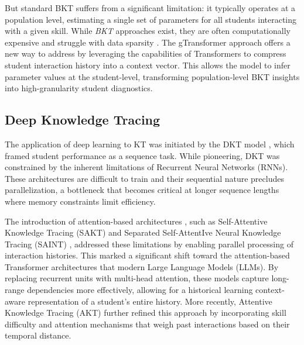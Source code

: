 \documentclass[applsci,article,submit,moreauthors,pdftex]{Definitions/mdpi}
\begin{document}
But standard BKT suffers from a significant limitation: it typically operates at a population level, estimating a single set of parameters for all students interacting with a given skill. While \textit{ BKT} approaches exist, they are often computationally expensive and struggle with data sparsity \citep{yudelson2013individualized}. The gTransformer approach offers a new way to address  by leveraging the capabilities of Transformers to compress student interaction history into a context vector. This allows the model to infer parameter values at the student-level, transforming population-level BKT insights into high-granularity student diagnostics.

\subsection{Deep Knowledge Tracing}

The application of deep learning to KT was initiated by the DKT model \citep{piech2015deep}, which framed student performance as a sequence  task. While pioneering, DKT was constrained by the inherent limitations of Recurrent Neural Networks (RNNs). These architectures are difficult to train \citep{Pascanu20132347} and their sequential nature precludes parallelization, a bottleneck that becomes critical at longer sequence lengths where memory constraints limit efficiency. 

The introduction of attention-based architectures \citep{vaswani2017attention}, such as Self-Attentive Knowledge Tracing (SAKT) \citep{Pandey2019384} and Separated Self-AttentIve Neural Knowledge Tracing (SAINT) \citep{choi2020towards}, addressed these limitations by enabling parallel processing of interaction histories. This marked a significant shift toward the attention-based Transformer architectures that  modern Large Language Models (LLMs). By replacing recurrent units with multi-head attention, these models capture long-range dependencies more effectively, allowing for a historical learning context-aware representation of a student's entire history. More recently, Attentive Knowledge Tracing (AKT) \citep{ghosh2020context} further refined this approach by incorporating skill difficulty and attention mechanisms that weigh past interactions based on their temporal distance. 
\end{document}
